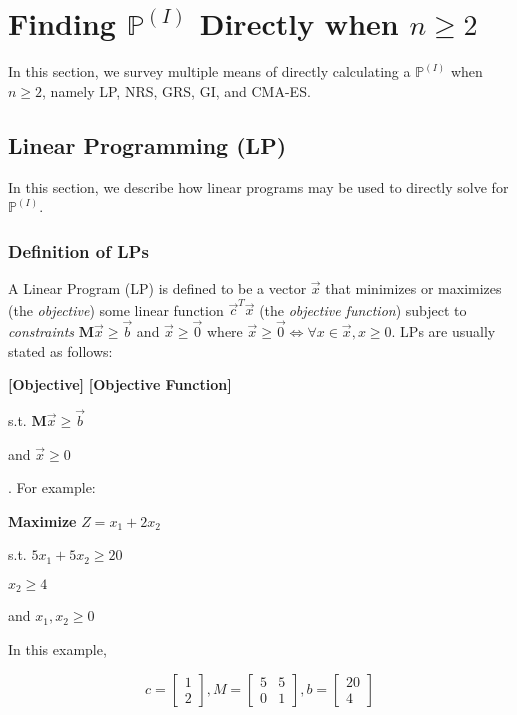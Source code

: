 \documentclass{article}
\begin{document}
\section{Finding $\mathbb{P}^{(I)}$ Directly when $n \geq 2$}
In this section, we survey multiple means of directly calculating a $\mathbb{P}^{(I)}$ when $n \geq 2$, namely LP, NRS, GRS, GI, and CMA-ES.

\subsection{Linear Programming (LP)}
In this section, we describe how linear programs may be used to directly solve for $\mathbb{P}^{(I)}$.

\subsubsection{Definition of LPs}
A Linear Program (LP) is defined to be a vector $\vec{x}$ that minimizes or maximizes (the \textit{objective}) some linear function $\vec{c}^T\vec{x}$ (the \textit{objective function}) subject to \textit{constraints} $\textbf{M}\vec{x} \geq \vec{b}$ and $\vec{x} \geq \vec{0}$ where $\vec{x} \geq \vec{0} \iff \forall x \in \vec{x}, x \geq 0$. LPs are usually stated as follows:

\hspace{6cm} \textbf{[Objective]} \textbf{[Objective Function]}

\hspace{6cm} s.t. $\textbf{M}\vec{x} \geq \vec{b}$

\hspace{6cm} and $\vec{x} \geq 0$

\cite{lpDef}. For example:

\hspace{6cm} \textbf{Maximize} $Z = x_1 + 2x_2$

\hspace{6cm} s.t. $5x_1 + 5x_2 \geq 20$

\hspace{7.8cm} $x_2 \geq 4$

\hspace{6cm} and $x_1, x_2 \geq 0$

In this example,

\[
c = \begin{bmatrix}
    1 \\
    2
\end{bmatrix},
M =\begin{bmatrix}
    5 & 5 \\
    0 & 1
\end{bmatrix},
b =\begin{bmatrix}
    20 \\
    4
\end{bmatrix}
\]
\end{document}
